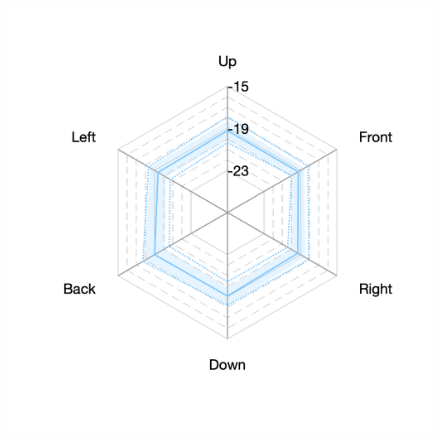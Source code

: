\documentclass[11pt,a4j]{jreport}
\begin{document}
\begin{figure}[H]
\begin{minipage}[b]{.33\textwidth}
    \label{fig:S06late}
  \end{minipage}%
  \begin{minipage}[b]{.33\textwidth}
    \centering
    \includegraphics[width=1\linewidth]{images/realHallDirSt/late_S05_allhall.png}
    \label{fig:S04late}
  \end{minipage}


\end{figure}
\end{document}
